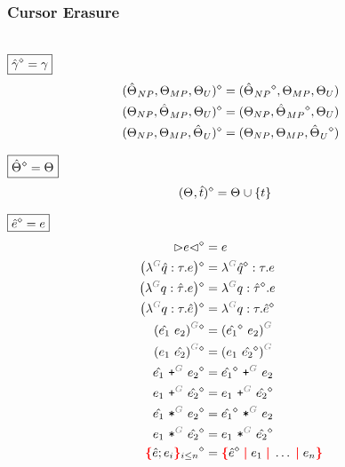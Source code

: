 
\subsubsection{Cursor Erasure}\hspace*{\fill} \\

\noindent $\boxed{\erase{\Z{\gamma}} = \gamma}$
%
\begin{align*}
  \erase{(\Z{\Set}_{NP}, \Set[MP], \Set[U])} &= (\erase{\Z{\Set}_{NP}}, \Set[MP], \Set[U]) \\
  \erase{(\Set[NP], \Z{\Set}_{MP}, \Set[U])} &= (\Set[NP], \erase{\Z{\Set}_{MP}}, \Set[U]) \\
  \erase{(\Set[NP], \Set[MP], \Z{\Set}_U)} &= (\Set[NP], \Set[MP], \erase{\Z{\Set}_U})
\end{align*}

\noindent $\boxed{\erase{\Z{\Set}} = \Set}$
%
\begin{align*}
  \erase{(\Set, \Z{t})} &= \Set \cup \SetOf{t}
\end{align*}

\noindent $\boxed{\erase{\Z{e}} = e}$
%
\begin{align*}
  \erase{\cursor{e}} &= e \\
  \erase{\left(\eFun{G}{\Z{q}}{\tau}{e}\right)} &= \eFun{G}{\erase{\Z{q}}}{\tau}{e} \\
  \erase{\left(\eFun{G}{q}{\Z{\tau}}{e}\right)} &= \eFun{G}{q}{\erase{\Z{\tau}}}{e} \\
  \erase{\left(\eFun{G}{q}{\tau}{\Z{e}}\right)} &= \eFun{G}{q}{\tau}{\erase{\Z{e}}} \\
  \erase{\eApp{G}{\Z{e_1}}{e_2}} &= \eApp{G}{\erase{\Z{e_1}}}{e_2} \\
  \erase{\eApp{G}{e_1}{\Z{e_2}}} &= \eApp{G}{e_1}{\erase{\Z{e_2}}} \\
  \erase{\ePlus{G}{\Z{e_1}}{e_2}} &= \ePlus{G}{\erase{\Z{e_1}}}{e_2} \\
  \erase{\ePlus{G}{e_1}{\Z{e_2}}} &= \ePlus{G}{e_1}{\erase{\Z{e_2}}} \\
  \erase{\eTimes{G}{\Z{e_1}}{e_2}} &= \eTimes{G}{\erase{\Z{e_1}}}{e_2} \\
  \erase{\eTimes{G}{e_1}{\Z{e_2}}} &= \eTimes{G}{e_1}{\erase{\Z{e_2}}} \\
  \erase{\conflictHoleForm{\Z{e}; e_i}{i \leq n}} &= \conflictHole{\erase{\Z{e}}, e_1, \ldots, e_n}
\end{align*}


